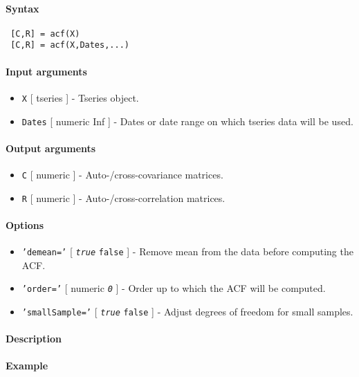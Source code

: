 


	\paragraph{Syntax}
 
 \begin{verbatim}
 [C,R] = acf(X)
 [C,R] = acf(X,Dates,...)
 \end{verbatim}
 
 \paragraph{Input arguments}
 
 \begin{itemize}
 \item
   \texttt{X} {[} tseries {]} - Tseries object.
 \item
   \texttt{Dates} {[} numeric \textbar{} Inf {]} - Dates or date range on
   which tseries data will be used.
 \end{itemize}
 
 \paragraph{Output arguments}
 
 \begin{itemize}
 \item
   \texttt{C} {[} numeric {]} - Auto-/cross-covariance matrices.
 \item
   \texttt{R} {[} numeric {]} - Auto-/cross-correlation matrices.
 \end{itemize}
 
 \paragraph{Options}
 
 \begin{itemize}
 \item
   \texttt{'demean='} {[} \emph{\texttt{true}} \textbar{} \texttt{false}
   {]} - Remove mean from the data before computing the ACF.
 \item
   \texttt{'order='} {[} numeric \textbar{} \emph{\texttt{0}} {]} - Order
   up to which the ACF will be computed.
 \item
   \texttt{'smallSample='} {[} \emph{\texttt{true}} \textbar{}
   \texttt{false} {]} - Adjust degrees of freedom for small samples.
 \end{itemize}
 
 \paragraph{Description}
 
 \paragraph{Example}



